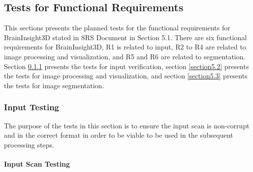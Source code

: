 \documentclass[12pt, titlepage]{article}
\begin{document}
\subsection{Tests for Functional Requirements}

This sections presents the planned tests for the functional requirements for BrainInsight3D stated in SRS Document
\cite{BrainInsightSRS2024} in Section 5.1. There are six functional requirements for BrainInsight3D,
R1 is related to input, R2 to R4 are related to image processing and visualization, and R5 and R6 are
related to segmentation. Section \ref{section5.1} presents the tests for input verification, section \ref{section5.2} presents
the tests for image processing and visualization, and section \ref{section5.3} presents the tests for image segmentation.



\subsubsection{Input Testing} \label{section5.1}


The purpose of the tests in this section is to ensure the input scan is non-corrupt and in
the correct format in order to be viable to be used in the subsequent processing steps.

\paragraph{Input Scan Testing}
\end{document}
